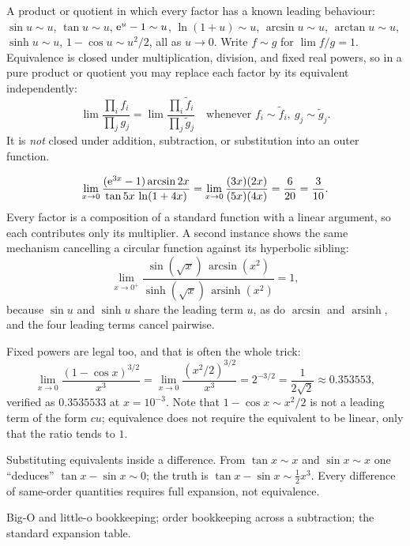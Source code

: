 \cue A product or quotient in which every factor has a known leading behaviour: $\sin u\sim u$, $\tan u\sim u$, $\mathrm{e}^{u}-1\sim u$, $\ln(1+u)\sim u$, $\arcsin u\sim u$, $\arctan u\sim u$, $\sinh u\sim u$, $1-\cos u\sim u^{2}/2$, all as $u\to0$.
\method Write $f\sim g$ for $\lim f/g=1$. Equivalence is closed under multiplication, division, and fixed real powers, so in a pure product or quotient you may replace each factor by its equivalent independently:
\[
\lim\frac{\prod_i f_i}{\prod_j g_j}=\lim\frac{\prod_i \tilde f_i}{\prod_j \tilde g_j}\quad\text{whenever }f_i\sim\tilde f_i,\ g_j\sim\tilde g_j .
\]
It is \emph{not} closed under addition, subtraction, or substitution into an outer function.

\begin{worked}
\[
\lim_{x\to0}\frac{(\mathrm{e}^{3x}-1)\arcsin 2x}{\tan 5x\,\ln(1+4x)}
=\lim_{x\to0}\frac{(3x)(2x)}{(5x)(4x)}=\frac{6}{20}=\frac{3}{10}.
\]
Every factor is a composition of a standard function with a linear argument, so each contributes only its multiplier. A second instance shows the same mechanism cancelling a circular function against its hyperbolic sibling:
\[
\lim_{x\to0^{+}}\frac{\sin(\sqrt{x})\,\arcsin(x^{2})}{\sinh(\sqrt{x})\,\operatorname{arsinh}(x^{2})}=1,
\]
because $\sin u$ and $\sinh u$ share the leading term $u$, as do $\arcsin$ and $\operatorname{arsinh}$, and the four leading terms cancel pairwise.

Fixed powers are legal too, and that is often the whole trick:
\[
\lim_{x\to0}\frac{(1-\cos x)^{3/2}}{x^{3}}=\lim_{x\to0}\frac{(x^{2}/2)^{3/2}}{x^{3}}=2^{-3/2}=\frac{1}{2\sqrt2}\approx0.353553 ,
\]
verified as $0.3535533$ at $x=10^{-3}$. Note that $1-\cos x\sim x^{2}/2$ is not a leading term of the form $cu$; equivalence does not require the equivalent to be linear, only that the ratio tends to $1$.
\end{worked}

\begin{trap}
Substituting equivalents inside a difference. From $\tan x\sim x$ and $\sin x\sim x$ one ``deduces'' $\tan x-\sin x\sim0$; the truth is $\tan x-\sin x\sim\tfrac12 x^{3}$. Every difference of same-order quantities requires full expansion, not equivalence.
\end{trap}

\begin{seealsob}Big-O and little-o bookkeeping; order bookkeeping across a subtraction; the standard expansion table.\end{seealsob}

